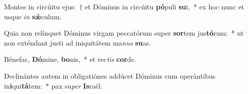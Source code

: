 \item Montes in circúitu ejus:~† et Dóminus in circúitu \textbf{pó}puli \textbf{su}i,~* ex hoc nunc et usque \textit{in} \textbf{sǽ}culum.
\item Quia non relínquet Dóminus virgam peccatórum super \textbf{sor}tem jus\textbf{tó}rum:~* ut non exténdant justi ad iniquitátem ma\textit{nus} \textbf{su}as.
\item Bénefac, \textbf{Dó}mine, \textbf{bo}nis,~* et rec\textit{tis} \textbf{cor}de.
\item Declinántes autem in obligatiónes addúcet Dóminus cum operántibus in\textbf{i}qui\textbf{tá}tem:~* pax su\textit{per} \textbf{Is}raël.
